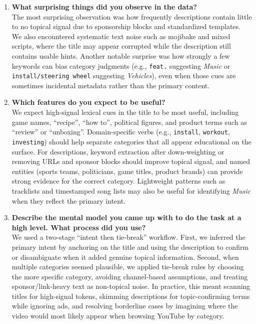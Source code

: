 \documentclass[11pt]{article}
\begin{document}
\begin{enumerate}
  \item \textbf{What surprising things did you observe in the data?}\\
  The most surprising observation was how frequently descriptions contain little to no topical signal due to sponsorship blocks and standardized templates. We also encountered systematic text noise such as mojibake and mixed scripts, where the title may appear corrupted while the description still contains usable hints. Another notable surprise was how strongly a few keywords can bias category judgments (e.g., \texttt{feat.} suggesting \emph{Music} or \texttt{install/steering wheel} suggesting \emph{Vehicles}), even when those cues are sometimes incidental metadata rather than the primary content.

  \item \textbf{Which features do you expect to be useful?}\\
  We expect high-signal lexical cues in the title to be most useful, including game names, ``recipe'', ``how to'', political figures, and product terms such as ``review'' or ``unboxing''. Domain-specific verbs (e.g., \texttt{install}, \texttt{workout}, \texttt{investing}) should help separate categories that all appear educational on the surface. For descriptions, keyword extraction after down-weighting or removing URLs and sponsor blocks should improve topical signal, and named entities (sports teams, politicians, game titles, product brands) can provide strong evidence for the correct category. Lightweight patterns such as tracklists and timestamped song lists may also be useful for identifying \emph{Music} when they reflect the primary intent.

  \item \textbf{Describe the mental model you came up with to do the task at a high level. What process did you use?}\\
  We used a two-stage ``intent then tie-break'' workflow. First, we inferred the primary intent by anchoring on the title and using the description to confirm or disambiguate when it added genuine topical information. Second, when multiple categories seemed plausible, we applied tie-break rules by choosing the more specific category, avoiding channel-based assumptions, and treating sponsor/link-heavy text as non-topical noise. In practice, this meant scanning titles for high-signal tokens, skimming descriptions for topic-confirming terms while ignoring ads, and resolving borderline cases by imagining where the video would most likely appear when browsing YouTube by category.


\end{enumerate}
\end{document}
